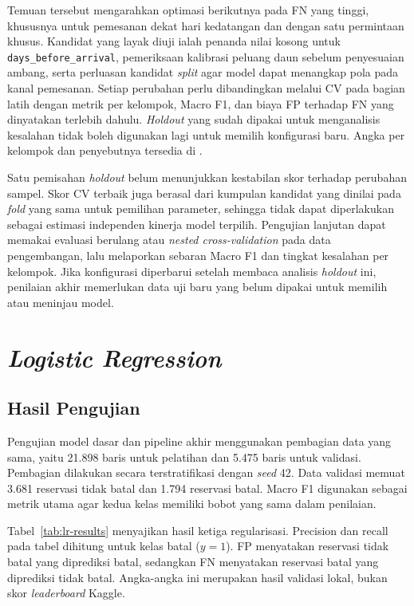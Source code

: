 Temuan tersebut mengarahkan optimasi berikutnya pada FN yang tinggi, khususnya untuk pemesanan dekat hari kedatangan dan dengan satu permintaan khusus. Kandidat yang layak diuji ialah penanda nilai kosong untuk \texttt{days\_before\_arrival}, pemeriksaan kalibrasi peluang daun sebelum penyesuaian ambang, serta perluasan kandidat \textit{split} agar model dapat menangkap pola pada kanal pemesanan. Setiap perubahan perlu dibandingkan melalui CV pada bagian latih dengan metrik per kelompok, Macro F1, dan biaya FP terhadap FN yang dinyatakan terlebih dahulu. \textit{Holdout} yang sudah dipakai untuk menganalisis kesalahan tidak boleh digunakan lagi untuk memilih konfigurasi baru. Angka per kelompok dan penyebutnya tersedia di .

Satu pemisahan \textit{holdout} belum menunjukkan kestabilan skor terhadap perubahan sampel. Skor CV terbaik juga berasal dari kumpulan kandidat yang dinilai pada \textit{fold} yang sama untuk pemilihan parameter, sehingga tidak dapat diperlakukan sebagai estimasi independen kinerja model terpilih. Pengujian lanjutan dapat memakai evaluasi berulang atau \textit{nested cross-validation} pada data pengembangan, lalu melaporkan sebaran Macro F1 dan tingkat kesalahan per kelompok. Jika konfigurasi diperbarui setelah membaca analisis \textit{holdout} ini, penilaian akhir memerlukan data uji baru yang belum dipakai untuk memilih atau meninjau model.

\section{\textit{Logistic Regression}}
\label{sec:hasil-lr}

\subsection{Hasil Pengujian}

Pengujian model dasar dan pipeline akhir menggunakan pembagian data yang sama, yaitu 21.898 baris untuk pelatihan dan 5.475 baris untuk validasi. Pembagian dilakukan secara terstratifikasi dengan \textit{seed} 42. Data validasi memuat 3.681 reservasi tidak batal dan 1.794 reservasi batal. Macro F1 digunakan sebagai metrik utama agar kedua kelas memiliki bobot yang sama dalam penilaian.

Tabel~\ref{tab:lr-results} menyajikan hasil ketiga regularisasi. Precision dan recall pada tabel dihitung untuk kelas batal ($y=1$). FP menyatakan reservasi tidak batal yang diprediksi batal, sedangkan FN menyatakan reservasi batal yang diprediksi tidak batal. Angka-angka ini merupakan hasil validasi lokal, bukan skor \textit{leaderboard} Kaggle.

